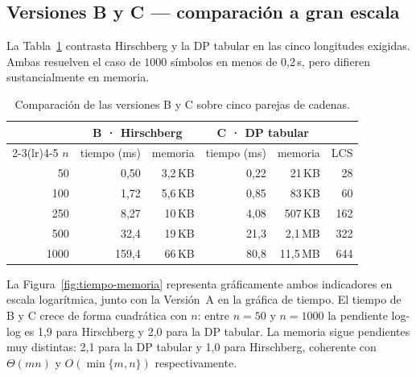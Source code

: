 \documentclass[11pt,a4paper]{article}
\begin{document}
\subsection{Versiones B y C — comparación a gran escala}

La Tabla~\ref{tab:BC} contrasta Hirschberg y la DP tabular en las cinco
longitudes exigidas. Ambas resuelven el caso de $1000$ símbolos en
menos de 0,2\,s, pero difieren sustancialmente en memoria.

\begin{table}[h]
\centering
\begin{tabular}{@{}rrrrrr@{}}
\toprule
& \multicolumn{2}{c}{\textbf{B · Hirschberg}}
& \multicolumn{2}{c}{\textbf{C · DP tabular}} & \\
\cmidrule(lr){2-3}\cmidrule(lr){4-5}
$n$ & tiempo (ms) & memoria & tiempo (ms) & memoria & LCS\\
\midrule
50   & 0{,}50  & 3{,}2\,KB & 0{,}22 & 21\,KB    & 28 \\
100  & 1{,}72  & 5{,}6\,KB & 0{,}85 & 83\,KB    & 60 \\
250  & 8{,}27  & 10\,KB    & 4{,}08 & 507\,KB   & 162 \\
500  & 32{,}4  & 19\,KB    & 21{,}3 & 2{,}1\,MB & 322 \\
1000 & 159{,}4 & 66\,KB    & 80{,}8 & 11{,}5\,MB & 644 \\
\bottomrule
\end{tabular}
\caption{Comparación de las versiones B y C sobre cinco parejas de
cadenas.}\label{tab:BC}
\end{table}

La Figura~\ref{fig:tiempo-memoria} representa gráficamente ambos
indicadores en escala logarítmica, junto con la Versión~A en la gráfica
de tiempo. El tiempo de B y C crece de forma cuadrática con $n$: entre
$n=50$ y $n=1000$ la pendiente log-log es 1,9 para Hirschberg y 2,0 para
la DP tabular. La memoria sigue pendientes muy distintas: 2,1 para la DP
tabular y 1,0 para Hirschberg, coherente con $\Theta(mn)$ y
$O(\min\{m,n\})$ respectivamente.
\end{document}

